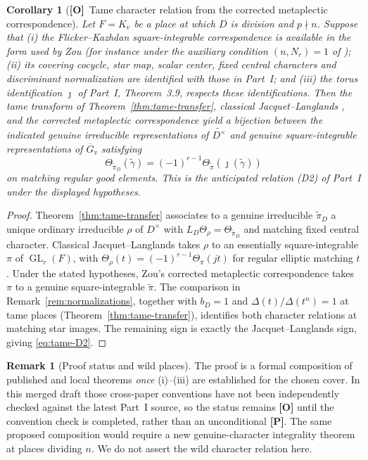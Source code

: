 \documentclass[11pt]{article}
\newcommand{\GL}{\operatorname{GL}}
\newcommand{\Gb}{\overline{G}}\newcommand{\GDb}{\overline{G}_D}\newcommand{\Zb}{\overline{Z}}
\newcommand{\Otag}{\textnormal{\textbf{[O]}}}
\theoremstyle{plain}
\newtheorem{corollary}[theorem]{Corollary}
\theoremstyle{definition}
\newtheorem{remark}[theorem]{Remark}
\begin{document}
\begin{corollary}[\Otag\ Tame character relation from the corrected metaplectic correspondence]\label{cor:D2tame}
Let $F=K_v$ be a place at which $D$ is division and $p\nmid n$.
Suppose that (i) the Flicker--Kazhdan square-integrable correspondence
is available in the form used by Zou
\cite[Proposition~3.6 and Definition~3.7]{Zou}
(for instance under the auxiliary condition $(n,N_r)=1$ of
\cite[\S26]{FK86}); (ii) its covering cocycle, star map, scalar center,
fixed central characters and discriminant normalization are identified
with those in Part~I; and (iii) the torus identification $\jmath$ of
Part~I, Theorem~3.9, respects these identifications.
Then the tame transform of Theorem~\ref{thm:tame-transfer}, classical
Jacquet--Langlands \cite{DKV}, and the corrected metaplectic
correspondence yield a bijection between the indicated genuine
irreducible representations of $\widetilde{D^\times}$ and genuine
square-integrable representations of $\Gb_v$ satisfying
\begin{equation}\label{eq:tame-D2}
  \Theta_{\widetilde\pi_D}(\widetilde\gamma)
 =(-1)^{r-1}\Theta_{\widetilde\pi}
     (\jmath(\widetilde\gamma))
\end{equation}
on matching regular good elements. This is the anticipated relation
(D2) of Part~I under the displayed hypotheses.
\end{corollary}
\begin{proof}
Theorem~\ref{thm:tame-transfer} associates to a genuine irreducible
$\widetilde\pi_D$ a unique ordinary irreducible $\rho$ of $D^\times$
with $L_D\Theta_\rho=\Theta_{\widetilde\pi_D}$ and matching fixed
central character. Classical Jacquet--Langlands takes $\rho$ to an
essentially square-integrable $\pi$ of $\GL_r(F)$, with
$\Theta_\rho(t)=(-1)^{r-1}\Theta_\pi(jt)$ for regular elliptic
matching $t$.  Under the stated hypotheses, Zou's corrected
metaplectic correspondence takes $\pi$ to a genuine
square-integrable $\widetilde\pi$.  The comparison in
Remark~\ref{rem:normalizations}, together with $b_D=1$ and
$\Delta(t)/\Delta(t^n)=1$ at tame places
(Theorem~\ref{thm:tame-transfer}), identifies both character
relations at matching star images. The remaining sign is exactly the
Jacquet--Langlands sign, giving \eqref{eq:tame-D2}.
\end{proof}
\begin{remark}[Proof status and wild places]
The proof is a formal composition of published and local theorems
\emph{once} (i)--(iii) are established for the chosen cover. In this
merged draft those cross-paper conventions have not been independently
checked against the latest Part~I source, so the status remains
\textbf{[O]} until the convention check is completed, rather than an unconditional \textbf{[P]}.
The same proposed composition would require a new genuine-character
integrality theorem at places dividing $n$. We do not assert the
wild character relation here.
\end{remark}
\end{document}
